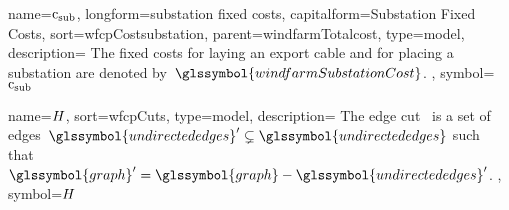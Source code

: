 {
    name={\ensuremath{\costsubstation}},
    longform={substation fixed costs},
    capitalform={Substation Fixed Costs},
    sort={wfcpCostsubstation},
    parent={windfarmTotalcost},
    type={model},
    description={
    The fixed costs for laying an export cable and for placing a
    substation are denoted by~$\glssymbol{windfarmSubstationCost}$.
    },
    symbol={\ensuremath{\costsubstation}}
}

{
    name={\ensuremath{ \cuts }},
    sort={wfcpCuts},
    type={model},
    description={ The edge cut~ is a set of edges~$
        \glssymbol{undirectededges}'\subsetneq
        \glssymbol{undirectededges}$ such that~$\glssymbol{graph}' = 
        \glssymbol{graph} - \glssymbol{undirectededges}'$. 
    },
    symbol={\ensuremath{ \cuts }}
}
